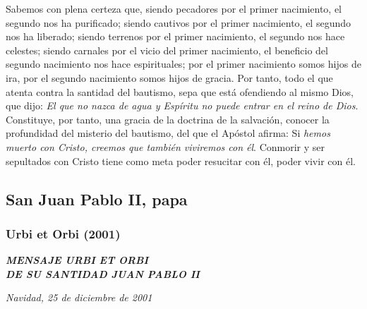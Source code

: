 \begin{body}
\begin{body}
Sabemos con plena certeza que, siendo pecadores por el primer nacimiento, el segundo nos ha purificado; siendo cautivos por el primer nacimiento, el segundo nos ha liberado; siendo terrenos por el primer nacimiento, el segundo nos hace celestes; siendo carnales por el vicio del primer nacimiento, el beneficio del segundo nacimiento nos hace espirituales; por el primer nacimiento somos hijos de ira, por el segundo nacimiento somos hijos de gracia. Por tanto, todo el que atenta contra la santidad del bautismo, sepa que está ofendiendo al mismo Dios, que dijo: \emph{El que no nazca de agua y Espíritu no puede entrar en el reino de Dios}. Constituye, por tanto, una gracia de la doctrina de la salvación, conocer la profundidad del misterio del bautismo, del que el Apóstol afirma: Si \emph{hemos muerto con Cristo, creemos que también viviremos con él}. Conmorir y ser sepultados con Cristo tiene como meta poder resucitar con él, poder vivir con él.


\subsection{San Juan Pablo II, papa}

\subsubsection{Urbi et Orbi (2001)} \textbf{\emph{MENSAJE URBI ET ORBI\\ DE SU SANTIDAD JUAN PABLO II}}

\emph{Navidad, 25 de diciembre de 2001}




\end{body}
\end{body}
